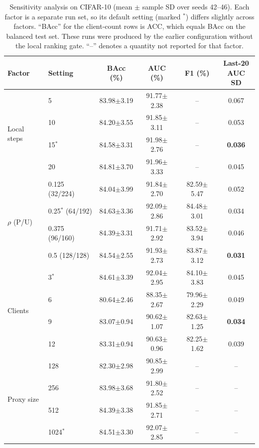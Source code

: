 \documentclass[lettersize,journal]{IEEEtran}
\begin{document}
\begin{table}[!t]
\centering
\caption{Sensitivity analysis on CIFAR-10 (mean $\pm$ sample SD over seeds 42--46). Each factor is a separate run set, so its default setting (marked $^{\ast}$) differs slightly across factors. ``BAcc'' for the client-count rows is ACC, which equals BAcc on the balanced test set. These runs were produced by the earlier configuration without the local ranking gate. ``--'' denotes a quantity not reported for that factor.}
\label{tab:sensitivity}
\scriptsize
\setlength{\tabcolsep}{3pt}
\begin{tabular}{llcccc}
\toprule
Factor & Setting & BAcc (\%) & AUC (\%) & F1 (\%) & \makecell{Last-20\\AUC SD} \\
\midrule
\multirow{4}{*}{Local steps}
& 5  & 83.98$\pm$3.19 & 91.77$\pm$2.38 & -- & 0.067 \\
& 10 & 84.20$\pm$3.55 & 91.85$\pm$3.11 & -- & 0.053 \\
& 15$^{\ast}$ & 84.58$\pm$3.31 & 91.98$\pm$2.76 & -- & \textbf{0.036} \\
& 20 & 84.81$\pm$3.70 & 91.96$\pm$3.33 & -- & 0.045 \\
\midrule
\multirow{4}{*}{$\rho$ (P/U)}
& 0.125 (32/224)  & 84.04$\pm$3.99 & 91.84$\pm$2.70 & 82.59$\pm$5.47 & 0.052 \\
& 0.25$^{\ast}$ (64/192) & 84.63$\pm$3.36 & 92.09$\pm$2.86 & 84.48$\pm$3.01 & 0.034 \\
& 0.375 (96/160) & 84.39$\pm$3.31 & 91.71$\pm$2.92 & 83.52$\pm$3.94 & 0.046 \\
& 0.5 (128/128)  & 84.54$\pm$2.55 & 91.93$\pm$2.73 & 83.87$\pm$3.12 & \textbf{0.031} \\
\midrule
\multirow{4}{*}{Clients}
& 3$^{\ast}$ & 84.61$\pm$3.39 & 92.04$\pm$2.95 & 84.10$\pm$3.83 & 0.045 \\
& 6  & 80.64$\pm$2.46 & 88.35$\pm$2.67 & 79.96$\pm$2.29 & 0.049 \\
& 9  & 83.07$\pm$0.94 & 90.62$\pm$1.07 & 82.63$\pm$1.25 & \textbf{0.034} \\
& 12 & 83.31$\pm$0.94 & 90.63$\pm$0.96 & 82.25$\pm$1.62 & 0.039 \\
\midrule
\multirow{4}{*}{Proxy size}
& 128  & 82.30$\pm$2.98 & 90.85$\pm$2.99 & -- & -- \\
& 256  & 83.98$\pm$3.68 & 91.80$\pm$2.52 & -- & -- \\
& 512  & 84.39$\pm$3.38 & 91.85$\pm$2.71 & -- & -- \\
& 1024$^{\ast}$ & 84.51$\pm$3.30 & 92.07$\pm$2.85 & -- & -- \\
\bottomrule
\end{tabular}
\end{table}
\end{document}
